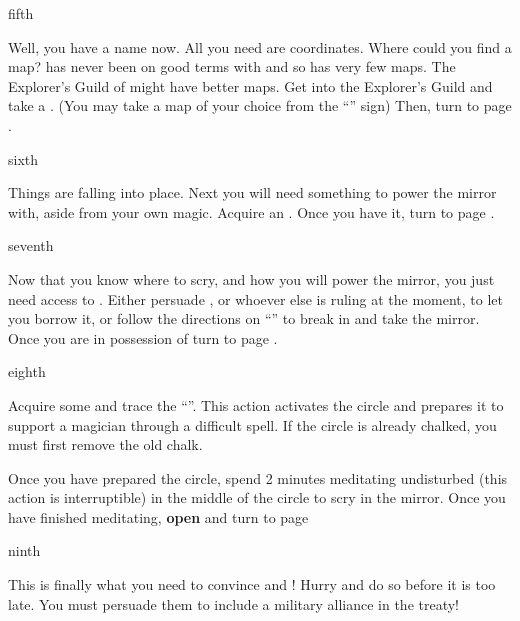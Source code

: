\documentclass[greennotebook]{NeptuneBall}
\begin{document}
\begin{page}{fifth}

Well, you have a name now. All you need are coordinates. Where could you find a map? \pPacifica{} has never been on good terms with \pIndia{} and so has very few maps. The Explorer's Guild of \pAtlantis{} might have better maps. Get into the Explorer's Guild and take a \iMapOfIndia{}. (You may take a map of your choice from the ``\sPileOfMaps{}'' sign) Then, turn to page .

\end{page}

\begin{page}{sixth}

Things are falling into place. Next you will need something to power the mirror with, aside from your own magic. Acquire an \iElectricEel{}. Once you have it, turn to page .

\end{page}

\begin{page}{seventh}

Now that you know where to scry, and how you will power the mirror, you just need access to \iScryingMirror{}. Either persuade \cKing{\King} \cKing{}, or whoever else is ruling \pAtlantis{} at the moment, to let you borrow it, or follow the directions on ``\sArtifactThree{}'' to break in and take the mirror. Once you are in possession of \iScryingMirror{} turn to page .

\end{page}

\begin{page}{eighth}

Acquire some \iChalk{} and trace the ``\sRunicCircle{}''. This action activates the circle and prepares it to support a magician through a difficult spell. If the circle is already chalked, you must first remove the old chalk.

Once you have prepared the circle, spend 2 minutes meditating undisturbed (this action is interruptible) in the middle of the circle to scry in the mirror. Once you have finished meditating, {\bf open \iScryingMirror{}} and turn to page 

\end{page}

\begin{page}{ninth}

This is finally what you need to convince \cKing{} and \cPrince{}! Hurry and do so before it is too late. You must persuade them to include a military alliance in the treaty!

\end{page}


\endnotebook
\end{document}
